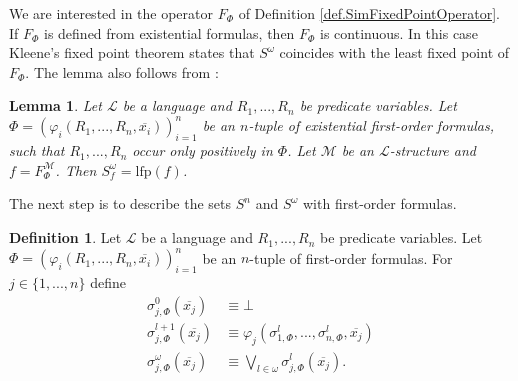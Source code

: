\documentclass[acmsmall]{acmart}
\theoremstyle{plain}
\newtheorem{lemma}[theorem]{Lemma}
\theoremstyle{definition}
\newtheorem{definition}[theorem]{Definition}
\newcommand{\calL}{\mathcal{L}}
\newcommand{\calM}{\mathcal{M}}
\newcommand{\mybar}[1]{\overline{#1}}
\newcommand{\lfp}{\mathrm{lfp}} %
\begin{document}
We are interested in the operator $F_{\Phi}$ of Definition \ref{def.SimFixedPointOperator}. If $F_{\Phi}$ is defined from existential formulas, then $F_{\Phi}$ is continuous. In this case Kleene's fixed point theorem states that $S^\omega$ coincides with the least fixed point of $F_{\Phi}$. The lemma also follows from \cite[Theorem 9]{Blass87Existential}:
%
\begin{lemma}\label{lem.apprClosureOrdinalOmega}
		Let $\calL$ be a language and $R_1,...,R_n$ be predicate variables. Let $\Phi =  (\varphi_i(R_1,...,R_n,\mybar{x_i}))_{i=1}^n$ be an $n$-tuple of existential first-order formulas, such that $R_1,...,R_n$ occur only positively in $\Phi$. Let $\calM$ be an $\calL$-structure and $f = F_{\Phi}^{\calM}$. Then $S_f^\omega = \lfp(f)$.
\end{lemma}

The next step is to describe the sets $S^{n}$ and $S^\omega$ with first-order formulas.
%
\begin{definition}\label{def.apprSigma}
	Let $\calL$ be a language and $R_1,...,R_n$ be predicate variables. Let $\Phi =  (\varphi_i(R_1,...,R_n,\mybar{x_i}))_{i=1}^n$ be an $n$-tuple of first-order formulas. For $j \in \{1,...,n\}$ define
	\begin{align*}
		\sigma_{j,\Phi}^0(\mybar{x_j}) &\equiv \bot\\
		\sigma_{j,\Phi}^{l+1}(\mybar{x_j}) &\equiv \varphi_j(\sigma_{1,\Phi}^l,...,\sigma_{n,\Phi}^l,\mybar{x_j})\\
		\sigma_{j,\Phi}^{\omega}(\mybar{x_j}) &\equiv \bigvee_{l\in \omega} \sigma_{j,\Phi}^l(\mybar{x_j}).
	\end{align*}
\end{definition}
\end{document}
